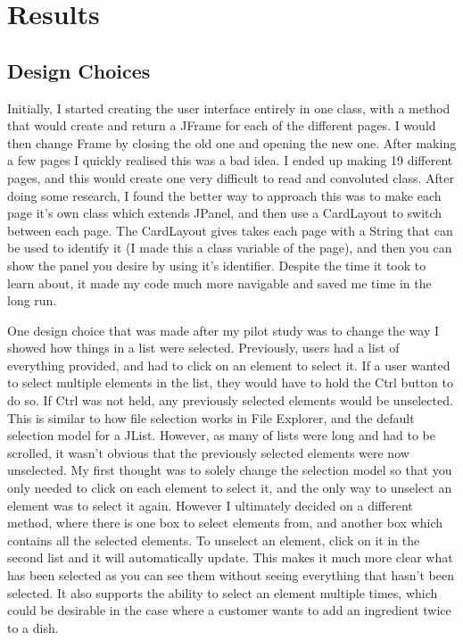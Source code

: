 \chapter{Results}

\section{Design Choices}
Initially, I started creating the user interface entirely in one class, with a method that would create and return a JFrame for each of the different pages. I would then change Frame by closing the old one and opening the new one. After making a few pages I quickly realised this was a bad idea. I ended up making 19 different pages, and this would create one very difficult to read and convoluted class. After doing some research\cite{cardLayout}, I found the better way to approach this was to make each page it's own class which extends JPanel, and then use a CardLayout to switch between each page. The CardLayout gives takes each page with a String that can be used to identify it (I made this a class variable of the page), and then you can show the panel you desire by using it's identifier. Despite the time it took to learn about, it made my code much more navigable and saved me time in the long run.

One design choice that was made after my pilot study was to change the way I showed how things in a list were selected. Previously, users had a list of everything provided, and had to click on an element to select it. If a user wanted to select multiple elements in the list, they would have to hold the Ctrl button to do so. If Ctrl was not held, any previously selected elements would be unselected. This is similar to how file selection works in File Explorer, and the default selection model for a JList. However, as many of lists were long and had to be scrolled, it wasn't obvious that the previously selected elements were now unselected. My first thought was to  solely change the selection model so that you only needed to click on each element to select it, and the only way to unselect an element was to select it again. However I ultimately decided on a different method, where there is one box to select elements from, and another box which contains all the selected elements. To unselect an element, click on it in the second list and it will automatically update. This makes it much more clear what has been selected as you can see them without seeing everything that hasn't been selected. It also supports the ability to select an element multiple times, which could be desirable in the case where a customer wants to add an ingredient twice to a dish.

